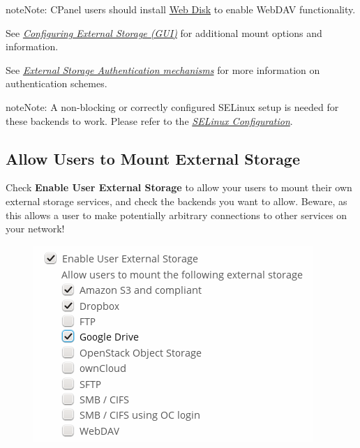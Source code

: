 \documentclass[letterpaper,10pt,english]{sphinxmanual}
\begin{document}
\begin{notice}{note}{Note:}
CPanel users should install \href{https://documentation.cpanel.net/display/ALD/Web+Disk}{Web Disk} to enable WebDAV
functionality.
\end{notice}

See {\hyperref[configuration_files/external_storage_configuration_gui::doc]{\emph{Configuring External Storage (GUI)}}} for additional mount
options and information.

See {\hyperref[configuration_files/external_storage/auth_mechanisms::doc]{\emph{External Storage Authentication mechanisms}}} for more information on authentication schemes.

\begin{notice}{note}{Note:}
A non-blocking or correctly configured SELinux setup is needed
for these backends to work. Please refer to the {\hyperref[installation/selinux_configuration:selinux-config-label]{\emph{SELinux Configuration}}}.
\end{notice}


\subsection{Allow Users to Mount External Storage}
\label{configuration_files/external_storage_configuration_gui:allow-users-to-mount-external-storage}
Check \textbf{Enable User External Storage} to allow your users to mount their own
external storage services, and check the backends you want to allow. Beware, as
this allows a user to make potentially arbitrary connections to other services
on your network!
\begin{figure}[htbp]
\centering

\includegraphics{user_mounts.png}
\end{figure}
\end{document}
